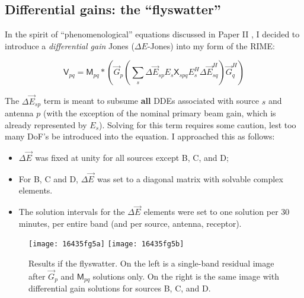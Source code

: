 \documentclass{aa}
\newcommand{\herm}{H}
\newcommand{\jones}[2]{\vec {#1}_{#2}}
\newcommand{\jonesT}[2]{\vec {#1}^{\herm}_{#2}}
\newcommand{\coh}[2]{\mathsf{{#1}}_{{#2}}}
\begin{document}
\subsection{Differential gains: the ``flyswatter''\label{sec:diffgains}}

In the spirit of ``phenomenological'' equations discussed in Paper II \citep[Sect.~1.3]{RRIME2}, I decided to introduce a {\em differential gain} Jones ($\Delta E$-Jones) into my form of the RIME:

\begin{equation}\label{eq:3C 147:de}
\coh{V}{pq} = \coh{M}{pq} \ast \left ( \jones{G}{p} \left( \sum_s \Delta\jones{E}{sp} E_s \coh{X}{spq} E^{\herm}_s \Delta\jonesT{E}{sq} \right)  \jonesT{G}{q} \right )
\end{equation}

The $\Delta\jones{E}{sp}$ term is meant to subsume {\bf all} DDEs associated with source $s$ and antenna $p$ (with the exception of the nominal primary beam gain, which is already represented by $E_s$). Solving for this term requires some caution, lest too many DoF's be introduced into the equation. I approached this as follows:

\begin{itemize}
\item $\Delta\jones{E}{}$ was fixed at unity for all sources except B, C, and D;
\item For B, C and D, $\Delta\jones{E}{}$ was set to a diagonal matrix with solvable complex elements.
\item The solution intervals for the $\Delta\jones{E}{}$ elements were set to one solution per 30 minutes, per entire band (and per source, antenna, receptor).
\end{itemize}

\begin{figure}
\begin{centering}
\texttt{[image: 16435fg5a]}%
\texttt{[image: 16435fg5b]}\par
\end{centering}
\caption{\label{fig:dEsol}Results if the flyswatter. On the left is a single-band residual image after  $\jones{G}{p}$ and $\coh{M}{pq}$ solutions only. On the right is the same image with differential gain solutions for sources B, C, and D.}
\end{figure}
\end{document}
